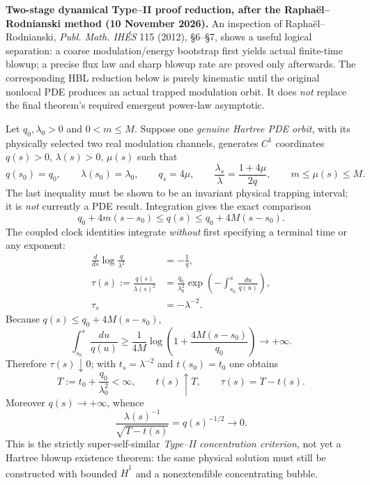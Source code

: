 \documentclass[11pt]{amsart}
\begin{document}
\medskip
\noindent\textbf{Two-stage dynamical Type--II proof reduction, after the
Rapha\"el--Rodnianski method (10 November 2026).}
An inspection of Rapha\"el--Rodnianski,
\emph{Publ. Math. IH\'ES} 115 (2012), \S6--\S7,
shows a useful logical separation: a coarse modulation/energy
bootstrap first yields actual finite-time blowup; a precise flux
law and sharp blowup rate are proved only afterwards.
The corresponding HBL reduction below is purely kinematic until
the original nonlocal PDE produces an actual trapped modulation orbit.
It does \emph{not} replace the final theorem's required emergent
power-law asymptotic.

Let \(q_0,\lambda_0>0\) and \(0<m\le M\). Suppose one
\emph{genuine Hartree PDE orbit}, with its physically selected two
real modulation channels, generates \(C^1\) coordinates
\(q(s)>0\), \(\lambda(s)>0\), \(\mu(s)\) such that
\[
 q(s_0)=q_0,\qquad \lambda(s_0)=\lambda_0,\qquad
 q_s=4\mu,\qquad
 \frac{\lambda_s}{\lambda}=\frac{1+4\mu}{2q},
 \qquad m\le\mu(s)\le M.
\]
The last inequality must be shown to be an invariant physical
trapping interval; it is \emph{not} currently a PDE result.
Integration gives the exact comparison
\[
 q_0+4m(s-s_0)\le q(s)\le q_0+4M(s-s_0).
\]
The coupled clock identities integrate \emph{without} first
specifying a terminal time or any exponent:
\[
 \begin{aligned}
 \frac{d}{ds}\log\frac q{\lambda^2}&=-\frac1q,\\
 \tau(s):=\frac{q(s)}{\lambda(s)^2}
 &=\frac{q_0}{\lambda_0^2}
   \exp\left(-\int_{s_0}^s\frac{du}{q(u)}\right),\\
 \tau_s&=-\lambda^{-2}.
 \end{aligned}
\]
Because \(q(s)\le q_0+4M(s-s_0)\),
\[
 \int_{s_0}^{s}\frac{du}{q(u)}
 \ge\frac1{4M}\log\left(1+\frac{4M(s-s_0)}{q_0}\right)
 \longrightarrow+\infty.
\]
Therefore \(\tau(s)\downarrow0\); with \(t_s=\lambda^{-2}\)
and \(t(s_0)=t_0\) one obtains
\[
 T:=t_0+\frac{q_0}{\lambda_0^2}<\infty,\qquad
 t(s)\uparrow T,\qquad
 \tau(s)=T-t(s).
\]
Moreover \(q(s)\to+\infty\), whence
\[
 \boxed{\quad
 \frac{\lambda(s)^{-1}}{\sqrt{T-t(s)}}
   =q(s)^{-1/2}\longrightarrow0.
 \quad}
\]
This is the strictly super-self-similar \emph{Type--II concentration
criterion}, not yet a Hartree blowup existence theorem: the same
physical solution must still be constructed with bounded
\(\dot H^1\) and a nonextendible concentrating bubble.
\end{document}
